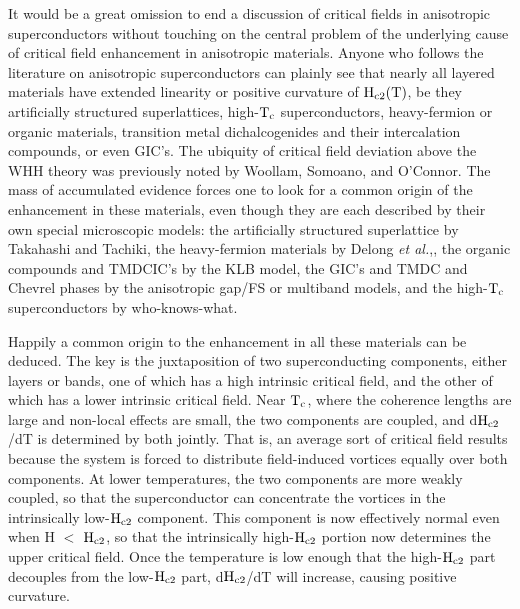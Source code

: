         It would be a great omis\-sion to end a dis\-cus\-sion of crit\-i\-cal fields
in an\-is\-o\-trop\-ic su\-per\-con\-duct\-ors  without touching on the  central problem of
the   underlying cause   of critical   field   enhancement  in  anisotropic
materials.   Anyone    who  follows    the    literature   on   anisotropic
superconductors  can plainly see  that   nearly all layered  materials have
extended  linearity   or positive  curvature  of  $\rm H_{c2}(T)$,  be they
artificially  structured superlattices, high-$\rm   T_c$   superconductors,
heavy-fermion or organic materials, transition   metal dichalcogenides  and
their intercalation compounds, or even   GIC's.   The ubiquity of  critical
field deviation  above  the WHH  theory  was  previously noted by  Woollam,
Somoano,  and O'Connor.\cite{woollam74}  The mass   of accumulated evidence
forces one   to look  for a  common  origin of   the  enhancement in  these
materials,   even  though   they are each    described by their own special
microscopic  models: the artificially  structured superlattice by Takahashi
and Tachiki,\cite{takahashi86b} the heavy-fermion materials by  Delong {\em
et  al.\/},\cite{delong87}, the organic  compounds and TMDCIC's  by the KLB
model,\cite{klemm75}   the GIC's  and   TMDC  and  Chevrel  phases  by  the
anisotropic gap/FS   or  multiband models,\cite{butler80,entel77}   and the
high-$\rm T_c$ superconductors by who-knows-what.\cite{marsiglio87}

        Happily a  common origin to  the enhancement in all these materials
can  be   deduced.  The key  is  the   juxtaposition of two superconducting
components, either  layers  or bands,  one of which  has a   high intrinsic
critical field,  and the other  of  which has  a lower intrinsic   critical
field.  Near $\rm T_c$, where the coherence lengths are large and non-local
effects are small, the two components are coupled, and  d$\rm H_{c2}$/dT is
determined by both  jointly.  That is, an average  sort  of critical  field
results  because the system is forced  to distribute field-induced vortices
equally over both components.   At  lower temperatures, the  two components
are more weakly coupled,  so  that the  superconductor can concentrate  the
vortices in  the intrinsically  low-$\rm H_{c2}$ component.  This component
is  now effectively   normal even when  H  $<$   $\rm H_{c2}$, so  that the
intrinsically  high-$\rm H_{c2}$ portion now  determines the upper critical
field.  Once the temperature is low enough that  the high-$\rm H_{c2}$ part
decouples from the low-$\rm H_{c2}$ part,   d$\rm  H_{c2}$/dT  will
increase, causing positive curvature.

